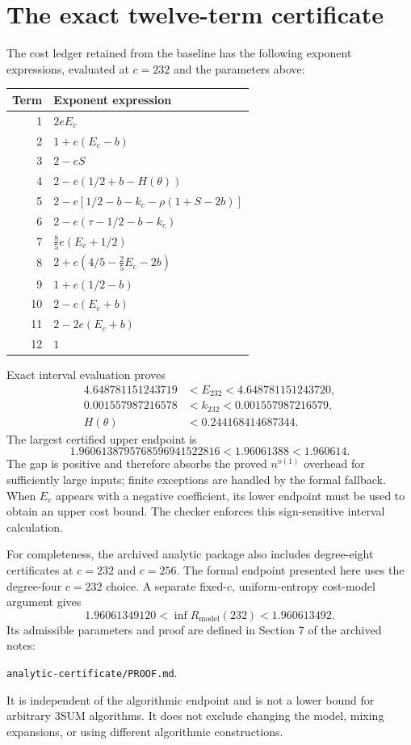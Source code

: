 \documentclass[11pt,a4paper]{article}
\newcommand{\code}[1]{\texttt{#1}}
\begin{document}
\section{The exact twelve-term certificate}
The cost ledger retained from the baseline has the following exponent
expressions, evaluated at $c=232$ and the parameters above:
\begin{center}\small
\begin{tabular}{@{}rl@{}}
\toprule
Term & Exponent expression\\\midrule
1 & $2eE_c$\\
2 & $1+e(E_c-b)$\\
3 & $2-eS$\\
4 & $2-e(1/2+b-H(\theta))$\\
5 & $2-e[1/2-b-k_c-\rho(1+S-2b)]$\\
6 & $2-e(\tau-1/2-b-k_c)$\\
7 & $\frac85e(E_c+1/2)$\\
8 & $2+e(4/5-\frac25E_c-2b)$\\
9 & $1+e(1/2-b)$\\
10 & $2-e(E_c+b)$\\
11 & $2-2e(E_c+b)$\\
12 & $1$\\\bottomrule
\end{tabular}
\end{center}
Exact interval evaluation proves
\begin{align*}
4.648781151243719&<E_{232}<4.648781151243720,\\
0.001557987216578&<k_{232}<0.001557987216579,\\
H(\theta)&<0.244168414687344.
\end{align*}
The largest certified upper endpoint is
\[
 1.9606138795768596941522816<1.96061388<1.960614.
\]
The gap is positive and therefore absorbs the proved $n^{o(1)}$ overhead
for sufficiently large inputs; finite exceptions are handled by the
formal fallback. When $E_c$ appears with a negative coefficient, its lower
endpoint must be used to obtain an upper cost bound. The checker enforces
this sign-sensitive interval calculation.

For completeness, the archived analytic package also includes degree-eight
certificates at $c=232$ and $c=256$. The formal endpoint presented here
uses the degree-four $c=232$ choice. A separate fixed-$c$, uniform-entropy
cost-model argument gives
\[
1.96061349120<\inf R_{\mathrm{model}}(232)<1.960613492.
\]
Its admissible parameters and proof are defined in Section 7 of the archived
notes:
\begin{center}\code{analytic-certificate/PROOF.md}.\end{center}
It is independent of the
algorithmic endpoint and is not a lower bound for arbitrary 3SUM algorithms.
It does not exclude changing the model, mixing expansions, or using
different algorithmic constructions.
\end{document}
